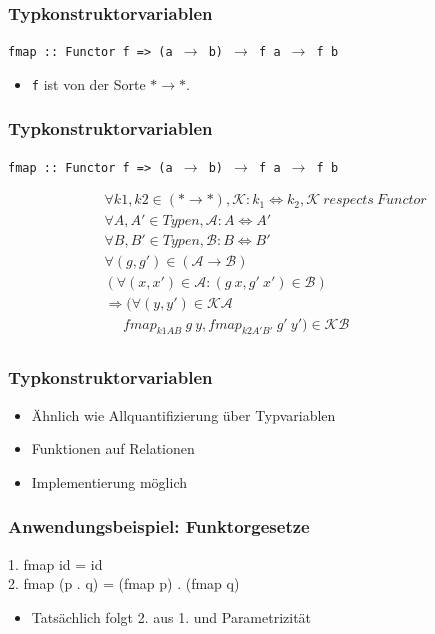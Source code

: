 \documentclass{beamer}
\begin{document}
\begin{frame}
\frametitle{Typkonstruktorvariablen}
\texttt{fmap :: Functor f => (a $\rightarrow$ b) $\rightarrow$ f\ a $\rightarrow$ f\ b}

\begin{itemize}
\item \texttt{f} ist von der Sorte $* \rightarrow *$.
\end{itemize}
\end{frame}

\begin{frame}
\frametitle{Typkonstruktorvariablen}

\texttt{fmap :: Functor f => (a $\rightarrow$ b) $\rightarrow$ f\ a $\rightarrow$ f\ b}

\begin{align*}
&\forall k1, k2 \in (* \rightarrow *), \mathcal{K} : k_1 \Leftrightarrow k_2, \mathcal{K}\ respects\ Functor \\
&\forall A, A' \in Typen, \mathcal{A} : A \Leftrightarrow A' \\
&\forall B, B' \in Typen, \mathcal{B} : B \Leftrightarrow B' \\
&\forall (g, g') \in (\mathcal{A} \rightarrow \mathcal{B}) \\
&(\forall (x, x') \in \mathcal{A}: (g\ x, g'\ x') \in \mathcal{B})\\
&\Rightarrow (\forall (y, y') \in \mathcal{K} \mathcal{A} \\
&\ \ \ \ \ \ fmap_{k1 A B}\ g\ y, fmap_{k2 A' B'}\ g'\ y') \in \mathcal{K} \mathcal{B}\\
\end{align*}
\end{frame}

\begin{frame}
\frametitle{Typkonstruktorvariablen}
\begin{itemize}
\item Ähnlich wie Allquantifizierung über Typvariablen
\item Funktionen auf Relationen
\item Implementierung möglich
\end{itemize}
\end{frame}

\begin{frame}
\frametitle{Anwendungsbeispiel: Funktorgesetze}

\begin{texttt}
1. fmap id      = id\\
2. fmap (p . q) = (fmap p) . (fmap q)
\end{texttt}

\begin{itemize}
\item Tatsächlich folgt 2. aus 1. und Parametrizität
\end{itemize}

\end{frame}
\end{document}
